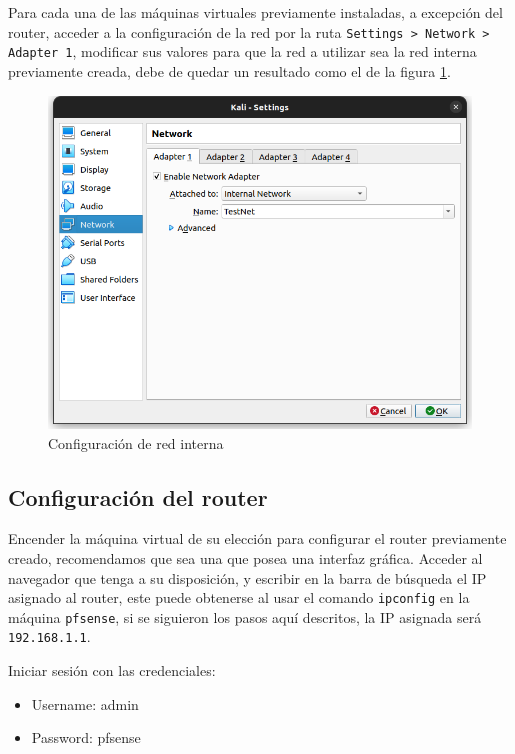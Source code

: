 \documentclass{article}
\begin{document}
            Para cada una de las máquinas virtuales previamente instaladas, a excepción del router, acceder a la configuración de la red por la ruta \texttt{Settings > Network > Adapter 1}, modificar sus valores para que la red a utilizar sea la red interna previamente creada, debe de quedar un resultado como el de la figura \ref{fig:all-internal}.
            \begin{figure}[!htbp]
                \centering
                \includegraphics[scale=0.25]{img/all-internal.png}
                \caption{Configuración de red interna}
                \label{fig:all-internal}
            \end{figure}

        \subsection{Configuración del router} \label{sec:router-config}

            Encender la máquina virtual de su elección para configurar el router previamente creado, recomendamos que sea una que posea una interfaz gráfica. Acceder al navegador que tenga a su disposición, y escribir en la barra de búsqueda el IP asignado al router, este puede obtenerse al usar el comando \texttt{ipconfig} en la máquina \texttt{pfsense}, si se siguieron los pasos aquí descritos, la IP asignada será \texttt{192.168.1.1}.

            Iniciar sesión con las credenciales:
            \begin{itemize}
                \item Username: admin
                \item Password: pfsense
            \end{itemize}
\end{document}
